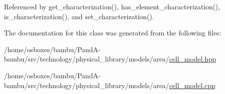 Referenced by get\+\_\+characterization(), has\+\_\+element\+\_\+characterization(), is\+\_\+characterization(), and set\+\_\+characterization().



The documentation for this class was generated from the following files\+:\begin{DoxyCompactItemize}
\item 
/home/osboxes/bambu/\+Pand\+A-\/bambu/src/technology/physical\+\_\+library/models/area/\hyperlink{cell__model_8hpp}{cell\+\_\+model.\+hpp}\item 
/home/osboxes/bambu/\+Pand\+A-\/bambu/src/technology/physical\+\_\+library/models/area/\hyperlink{cell__model_8cpp}{cell\+\_\+model.\+cpp}\end{DoxyCompactItemize}
